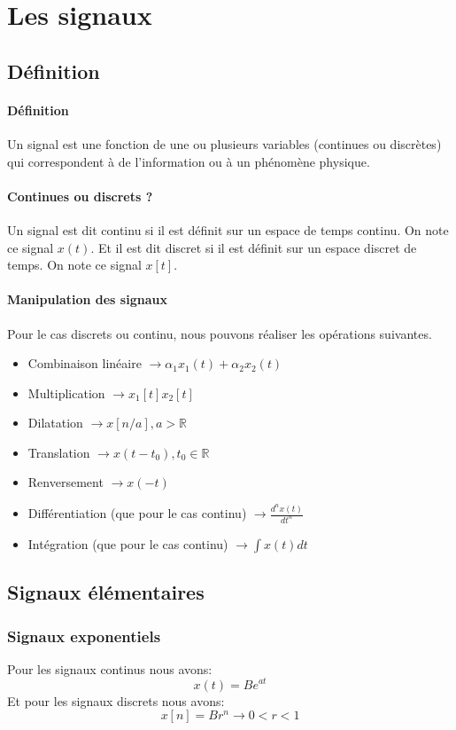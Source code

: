 \documentclass{report}
\begin{document}
\chapter{Les signaux}
\section{Définition}
\subsubsection{Définition}
Un signal est une fonction de une ou plusieurs variables (continues ou discrètes) qui correspondent à de l'information ou à un phénomène physique.

\subsubsection{Continues ou discrets ?}
Un signal est dit continu si il est définit sur un espace de temps continu. On note ce signal $x(t)$. Et il est dit discret si il est définit sur un espace discret de temps. On note ce signal $x[t]$.

\subsubsection{Manipulation des signaux}
Pour le cas discrets ou continu, nous pouvons réaliser les opérations suivantes.
\begin{itemize}
\item Combinaison linéaire $\rightarrow \alpha_{1}x_{1}(t) + \alpha_{2}x_{2}(t)$
\item Multiplication $ \rightarrow x_{1}[t]x_{2}[t]$
\item Dilatation $ \rightarrow x[n/a], a > \mathbb{R}$
\item Translation $ \rightarrow x(t - t_0), t_0 \in \mathbb{R}$
\item Renversement $ \rightarrow x(-t)$
\item Différentiation (que pour le cas continu) $ \rightarrow \frac{d^n x(t)}{dt^n}$
\item Intégration (que pour le cas continu) $\rightarrow \int x(t) dt$
\end{itemize}

\section{Signaux élémentaires}
\subsection{Signaux exponentiels}
Pour les signaux continus nous avons:
\begin{equation}
x(t) = B e^{at}
\end{equation}
Et pour les signaux discrets nous avons:
\begin{equation}
x[n] = Br^n \rightarrow 0 < r < 1
\end{equation}
\end{document}
